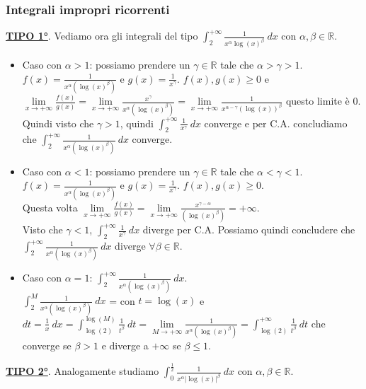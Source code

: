 \subsubsection{Integrali impropri ricorrenti}
\underline{\textbf{TIPO 1°}}. Vediamo ora gli integrali del tipo $\int_2^{+\infty}\frac{1}{x^{\alpha}\log(x)^{\beta}}\:dx$ con $\alpha, \beta \in \mathbb{R}$.
\begin{itemize}
    \item Caso con $\alpha > 1$: possiamo prendere un $\gamma \in \mathbb{R}$ tale che $\alpha > \gamma > 1$.\\
    $f(x) = \frac{1}{x^{\alpha}(\log(x)^{\beta})}$ e $g(x) = \frac{1}{x^{\gamma}}$. $f(x), g(x) \geq 0$ e $\lim\limits_{x\to +\infty}\frac{f(x)}{g(x)} = \lim\limits_{x\to +\infty} \frac{x^{\gamma}}{x^{\alpha}(\log(x)^{\beta})} = \lim\limits_{x\to +\infty} \frac{1}{x^{\alpha-\gamma}(\log(x))^{\beta}}$ questo limite è 0.\\
    Quindi visto che $\gamma > 1$, quindi $\int_2^{+\infty}\frac{1}{x^{\gamma}}\:dx$ converge e per C.A. concludiamo che $\int_2^{+\infty}\frac{1}{x^{\alpha}(\log(x)^{\beta})}\:dx$ converge.
    \item Caso con $\alpha < 1$: possiamo prendere un $\gamma \in \mathbb{R}$ tale che $\alpha < \gamma < 1$.\\
    $f(x) = \frac{1}{x^{\alpha}(\log(x)^{\beta})}$ e $g(x) = \frac{1}{x^{\gamma}}$. $f(x), g(x) \geq 0$.\\
    Questa volta $\lim\limits_{x\to +\infty}\frac{f(x)}{g(x)} = \lim\limits_{x\to +\infty}\frac{x^{\gamma-\alpha}}{(\log(x)^{\beta})} = +\infty$.\\
    Visto che $\gamma < 1$, $\int_2^{+\infty}\frac{1}{x^{\gamma}}\:dx$ diverge per C.A. Possiamo quindi concludere che $\int_2^{+\infty}\frac{1}{x^{\alpha}(\log(x)^{\beta})}\:dx$ diverge $\forall \beta \in \mathbb{R}$.
    \item Caso con $\alpha = 1$: $\int_2^{+\infty}\frac{1}{x^{\alpha}(\log(x)^{\beta})}\:dx$.\\
    $\int_2^{M}\frac{1}{x^{\alpha}(\log(x)^{\beta})}\:dx$ = con $t = \log(x)$ e $dt = \frac{1}{x}\:dx = \int_{\log(2)}^{\log(M)}\frac{1}{t^{\beta}}\:dt = \lim\limits_{M\to +\infty}\frac{1}{x^{\alpha}(\log(x)^{\beta})} = \int_{\log(2)}^{+\infty}\frac{1}{t^{\beta}}\:dt$ che converge se $\beta > 1$ e diverge a $+\infty$ se $\beta \leq 1$.
\end{itemize}
\underline{\textbf{TIPO 2°}}. Analogamente studiamo $\int_0^{\frac{1}{2}}\frac{1}{x^{\alpha}|\log(x)|^{\beta}}\:dx$ con $\alpha, \beta \in \mathbb{R}$.\\
